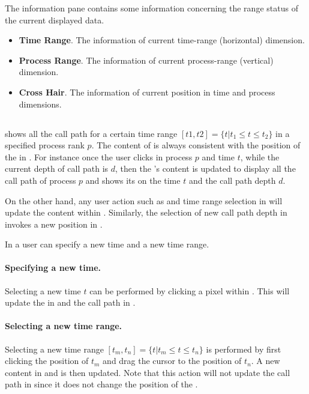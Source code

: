 The information pane contains some information concerning the range status of the current displayed data.
\begin{itemize}
 \item \textbf{Time Range}. The information of current time-range (horizontal) dimension. 
 \item \textbf{Process Range}. The information of current process-range (vertical) dimension. 
 \item \textbf{Cross Hair}. The information of current \crosshair{} position in time and process dimensions. 
\end{itemize}

\subsection{\depthview}
\label{sec:depthview}

\depthview{} shows all the call path for a certain time range $[t1,t2]= \{t | t_1\leq t\leq t_2\}$ in a specified process rank $p$. The content of \depthview{} is always consistent with the position of the \crosshair{} in \traceview{}.
For instance once the user clicks in process $p$ and time $t$, while the current depth of call path is $d$, then the \depthview's content is updated to display all the call path of process $p$ and shows its \crosshair{} on the time $t$ and the call path depth $d$.

On the other hand, any user action such as \crosshair{} and time range selection in \depthview{} will update the content within \traceview. Similarly, the selection of new call path depth in \callview{} invokes a new position in \depthview.

In \depthview{} a user can specify a new \crosshair{} time and a new time range.
\paragraph{Specifying a new \crosshair{} time.} Selecting a new \crosshair{} time $t$ can be performed by clicking a pixel within \depthview{}. This will update the \crosshair{} in \traceview{} and the call path in \callview.

\paragraph{Selecting a new time range.} Selecting a new time range $[t_m,t_n]= \{t | t_m\leq t\leq t_n\}$ is performed by first clicking the position of $t_m$ and drag the cursor to the position of $t_n$. A new content in \depthview{} and \traceview{} is then updated. Note that this action will not update the call path in \callview{} since it does not change the position of the \crosshair.


